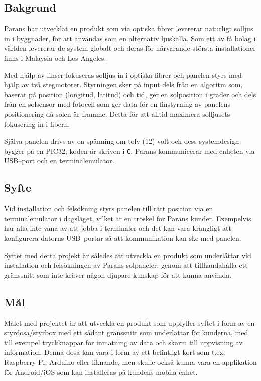 \documentclass{article}
\begin{document}
        \subsection{Bakgrund} %
        \label{sub:bakgrund}
            Parans har utvecklat en produkt som via optiska fibrer levererar naturligt solljus in i byggnader, för att användas som en alternativ ljuskälla. Som ett av få bolag i världen levererar de system globalt och deras för närvarande största installationer finns i Malaysia och Los Angeles.\bigskip

            \noindent Med hjälp av linser fokuseras solljus in i optiska fibrer och panelen styrs med hjälp av två stegmotorer. Styrningen sker på input dels från en algoritm som, baserat på position (longitud, latitud) och tid, ger en solposition i grader och dels från en solsensor med fotocell som ger data för en finstyrning av panelens positionering då solen är framme. Detta för att alltid maximera solljusets fokusering in i fibern.\bigskip

            \noindent Själva panelen drivs av en spänning om tolv (12) volt och dess systemdesign bygger på en PIC32; koden är skriven i \texttt{C}. Parans kommunicerar med enheten via USB--port och en terminalemulator. 
        
        \subsection{Syfte} %
        \label{sub:syfte}
            Vid installation och felsökning styrs panelen till rätt position via en terminalemulator i dagsläget, vilket är en tröskel för Parans kunder.  Exempelvis har alla inte vana av att jobba i terminaler och det kan vara krångligt att konfigurera datorns USB--portar så att kommunikation kan ske med panelen. \bigskip

            \noindent Syftet med detta projekt är således att utveckla en produkt som underlättar vid installation och felsökningen av Parans solpaneler, genom att tillhandahålla ett gränssnitt som inte kräver någon djupare kunskap för att kunna använda.
        
        \subsection{Mål} %
        \label{sub:mal}
          
          Målet med projektet är att utveckla en produkt som uppfyller syftet i form av en styr\-dosa/styrbox med ett sådant gränssnitt som underlättar för kunderna, med till exempel tryckknappar för inmatning av data och skärm till uppvisning av information. Denna dosa kan vara i form av ett befintligt kort som t.ex. Raspberry Pi, Arduino eller liknande, men skulle också kunna vara en applikation för Android/iOS som kan installeras på kundens mobila enhet.
\end{document}
